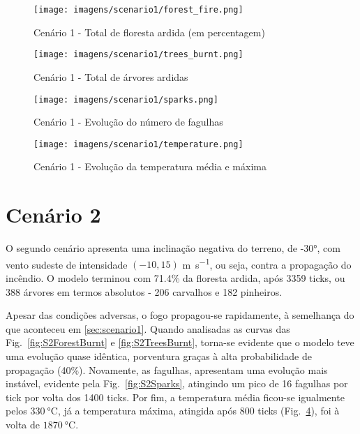 \begin{figure}[H]
    \texttt{[image: imagens/scenario1/forest\_fire.png]}
    \caption{Cenário 1 - Total de floresta ardida (em percentagem)}
    \label{fig:S1ForestBurnt}        
\end{figure}
    
\begin{figure}[H]
    \centering
    \texttt{[image: imagens/scenario1/trees\_burnt.png]}
    \caption{Cenário 1 - Total de árvores ardidas}
    \label{fig:S1TreesBurnt}
\end{figure}

\begin{figure}[H]
    \centering
    \texttt{[image: imagens/scenario1/sparks.png]}
    \caption{Cenário 1 - Evolução do número de fagulhas}
    \label{fig:S1Sparks}
\end{figure}

\begin{figure}[H]
    \centering
    \texttt{[image: imagens/scenario1/temperature.png]}
    \caption{Cenário 1 - Evolução da temperatura média e máxima}
    \label{fig:S1Temp}
\end{figure}

\section{Cenário 2}\label{sec:scenario2}

O segundo cenário apresenta uma inclinação negativa do terreno, de \ang{-30}, com vento sudeste de intensidade $(-10, 15)$ \si{\meter\per\second}, ou seja, contra a propagação do incêndio. O modelo terminou com 71.4\% da floresta ardida, após 3359 ticks, ou 388 árvores em termos absolutos - 206 carvalhos e 182 pinheiros.

Apesar das condições adversas, o fogo propagou-se rapidamente, à semelhança do que aconteceu em \ref{sec:scenario1}. Quando analisadas as curvas das Fig.~\ref{fig:S2ForestBurnt} e \ref{fig:S2TreesBurnt}, torna-se evidente que o modelo teve uma evolução quase idêntica, porventura graças à alta probabilidade de propagação (40\%). Novamente, as fagulhas, apresentam uma evolução mais instável, evidente pela Fig.~\ref{fig:S2Sparks}, atingindo um pico de 16 fagulhas por tick por volta dos 1400 ticks. Por fim, a temperatura média ficou-se igualmente pelos $\SI{330}{\degreeCelsius}$, já a temperatura máxima, atingida após 800 ticks (Fig.~\ref{fig:S1Temp}), foi à volta de $\SI{1870}{\degreeCelsius}$.


